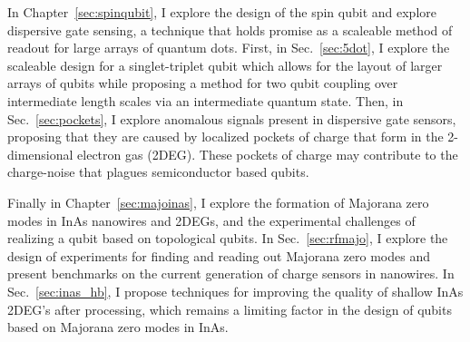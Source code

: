 In Chapter~\ref{sec:spinqubit}, I explore the design of the spin qubit and explore dispersive gate sensing, a
technique that holds promise as a scaleable method of readout for large arrays of quantum dots. First, in Sec.~\ref{sec:5dot},
I explore the scaleable design for a singlet-triplet qubit which allows for the layout of larger arrays of qubits
while proposing a method for two qubit coupling over intermediate length scales via an intermediate quantum state.
Then, in Sec.~\ref{sec:pockets}, I explore anomalous signals present in dispersive gate sensors, proposing that they
are caused by localized pockets of charge that form in the 2-dimensional electron gas (2DEG). These pockets of charge may
contribute to the charge-noise that plagues semiconductor based qubits.

Finally in Chapter~\ref{sec:majoinas}, I explore the formation of Majorana zero modes in InAs nanowires and 2DEGs,
and the experimental challenges of realizing a qubit based on topological qubits. In Sec.~\ref{sec:rfmajo}, I explore
the design of experiments for finding and reading out Majorana zero modes and present benchmarks on the current
generation of charge sensors in nanowires. In Sec.~\ref{sec:inas_hb}, I propose techniques for improving the quality
of shallow InAs 2DEG's after processing, which remains a limiting factor in the design of qubits based on Majorana zero
modes in InAs.